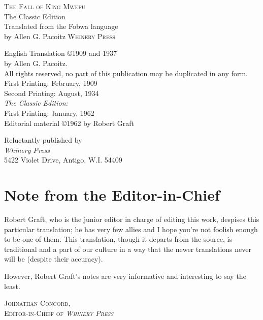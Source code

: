 \frontmatter

\pagestyle{empty}

\begin{center}
\textsc{\LARGE The Fall of King Mwe\-fu}\\
\large The Classic Edition\\[1.5cm]
Translated from the Fo\-bwa language\\ by Allen G. Pa\-co\-itz
\null\vfill
\textsc{Whinery Press}
\end{center}

\break
\null

\break
\null\vfill
{
\small
\noindent
English Translation \copyright 1909 and 1937\\by Allen G. Pa\-co\-itz.\\[0.3cm]
All rights reserved, no part of this publication may be duplicated in any form.\\[1.5cm]

\noindent
First Printing: February, 1909\\
Second Printing: August, 1934\\[0.5cm]

\noindent
\emph{The Classic Edition:} \\
First Printing: January, 1962\\
Editorial material \copyright 1962 by Robert Graft\\[2cm]
}

\noindent
Reluctantly published by\\
\emph{Whinery Press} \\
5422 Violet Drive, Antigo, W.I. 54409

\pagestyle{plain}

\chapter*{Note from the Editor-in-Chief}
Robert Graft, who is the junior editor in charge of editing this work, despises this particular translation; he has very few allies and I hope you're not foolish enough to be one of them. This translation, though it departs from the source, is traditional and a part of our culture in a way that the newer translations never will be (despite their accuracy).

However, Robert Graft's notes are very informative and interesting to say the least.
\begin{flushright}
\textsc{
Johnathan Concord,\\
Editor-in-Chief of \emph{Whinery Press}}
\clearpage
\end{flushright}



